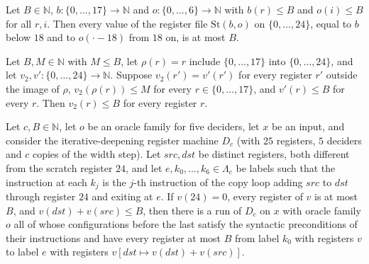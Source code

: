 \begin{theorem}
\label{Complexity.LogProg.SavitchARM.dpSt_bd}
\leanok
{}
Let $B\in\mathbb{N}$, $b:\{0,\dots,17\}\to\mathbb{N}$ and $o:\{0,\dots,6\}\to\mathbb{N}$ with
$b(r)\le B$ and $o(i)\le B$ for all $r,i$. Then every value of the register file
$\mathrm{St}(b,o)$ on $\{0,\dots,24\}$, equal to $b$ below $18$ and to $o(\cdot-18)$ from $18$ on,
is at most $B$.
\end{theorem}

\begin{theorem}
\label{Complexity.LogProg.SavitchARM.dp_bd_blk}
\leanok
{}
Let $B,M\in\mathbb{N}$ with $M\le B$, let $\rho(r)=r$ include $\{0,\dots,17\}$ into
$\{0,\dots,24\}$, and let $v_2,v':\{0,\dots,24\}\to\mathbb{N}$. Suppose $v_2(r')=v'(r')$ for every
register $r'$ outside the image of $\rho$, $v_2(\rho(r))\le M$ for every $r\in\{0,\dots,17\}$, and
$v'(r)\le B$ for every $r$. Then $v_2(r)\le B$ for every register $r$.
\end{theorem}

\begin{theorem}
\label{Complexity.LogProg.SavitchARM.dp_copy}
\leanok
{}
Let $c,B\in\mathbb{N}$, let $o$ be an oracle family for five deciders, let $x$ be an input, and
consider the iterative-deepening register machine $D_c$ (with $25$ registers, $5$ deciders and $c$ copies of the width step). Let $\mathit{src},\mathit{dst}$ be distinct registers, both different from the
scratch register $24$, and let $e,k_0,\dots,k_6\in\Lambda_c$ be labels such that the instruction at
each $k_j$ is the $j$-th instruction of the copy loop adding $\mathit{src}$ to $\mathit{dst}$
through register $24$ and exiting at $e$. If $v(24)=0$, every register of $v$ is at most $B$, and
$v(\mathit{dst})+v(\mathit{src})\le B$, then there is a run of $D_c$ on $x$ with oracle family $o$ all of whose configurations before the last satisfy the syntactic preconditions of their instructions and have every register at most $B$ from label $k_0$ with registers $v$
to label $e$ with registers $v[\mathit{dst}\mapsto v(\mathit{dst})+v(\mathit{src})]$.
\end{theorem}

